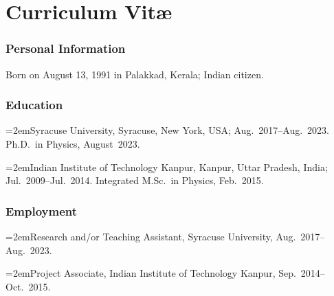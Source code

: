 
\chapter*{Curriculum Vit\ae}
\thispagestyle{empty}

\subsection*{Personal Information}

Born on August 13, 1991 in Palakkad, Kerala; Indian citizen.

\def\hangpar{\noindent\hangindent=2em}

\subsection*{Education}

\hangpar Syracuse University, Syracuse, New York, USA; Aug.~2017--Aug.~2023.\\
Ph.D.~in Physics, August~2023.

\hangpar Indian Institute of Technology Kanpur, Kanpur, Uttar Pradesh, India; Jul.~2009--Jul.~2014. Integrated M.Sc.~in Physics, Feb.~2015.

\subsection*{Employment}

\hangpar Research and/or Teaching Assistant, Syracuse University, Aug.~2017--Aug.~2023.

\hangpar Project Associate, Indian Institute of Technology Kanpur, Sep.~2014--Oct.~2015.


